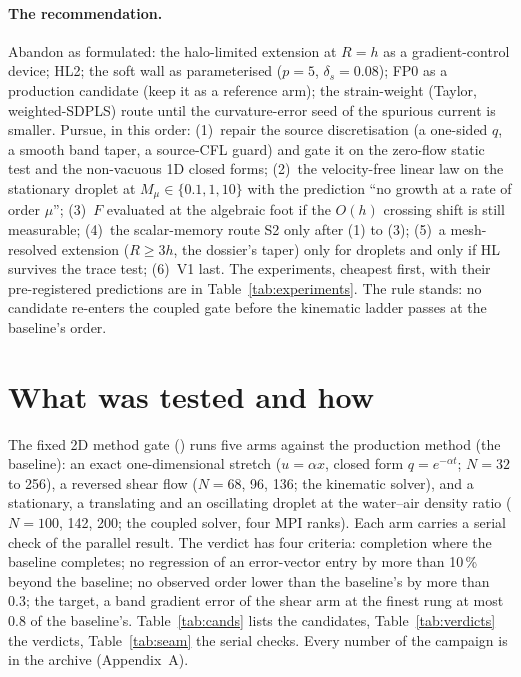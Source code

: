\documentclass[11pt,a4paper]{article}
\newcommand{\archive}{\path{shared-method-config-2026-09-01-192-g1150e68}}
\begin{document}
\paragraph{The recommendation.} Abandon as formulated: the halo-limited extension at $R=h$ as a
gradient-control device; HL2; the soft wall as parameterised ($p=5$, $\delta_s=0.08$); FP0 as
a production candidate (keep it as a reference arm); the strain-weight (Taylor, weighted-SDPLS)
route until the curvature-error seed of the spurious current is smaller. Pursue, in this
order: (1)~repair the source discretisation (a one-sided $q$, a smooth band taper, a source-CFL
guard) and gate it on the zero-flow static test and the non-vacuous 1D closed forms; (2)~the
velocity-free linear law on the stationary droplet at $M_\mu\in\{0.1,1,10\}$ with the
prediction ``no growth at a rate of order $\mu$''; (3)~$F$ evaluated at the algebraic foot if
the $O(h)$ crossing shift is still measurable; (4)~the scalar-memory route S2 only after (1) to
(3); (5)~a mesh-resolved extension ($R\ge3h$, the dossier's taper) only for droplets and only if
HL survives the trace test; (6)~V1 last. The experiments, cheapest first, with their
pre-registered predictions are in Table~\ref{tab:experiments}. The rule stands: no candidate
re-enters the coupled gate before the kinematic ladder passes at the baseline's order.

\section{What was tested and how}
\label{sec:gate}

The fixed 2D method gate () runs five arms against the
production method (the baseline): an exact one-dimensional stretch ($u=\alpha x$, closed form
$q=e^{-\alpha t}$; $N=32$ to 256), a reversed shear flow ($N=68$, 96, 136; the kinematic
solver), and a stationary, a translating and an oscillating droplet at the water--air density
ratio ($N=100$, 142, 200; the coupled solver, four MPI ranks). Each arm carries a serial check
of the parallel result. The verdict has four criteria: completion where the baseline completes;
no regression of an error-vector entry by more than 10\,\% beyond the baseline; no observed
order lower than the baseline's by more than 0.3; the target, a band gradient error of the
shear arm at the finest rung at most 0.8 of the baseline's. Table~\ref{tab:cands} lists the
candidates, Table~\ref{tab:verdicts} the verdicts, Table~\ref{tab:seam} the serial checks.
Every number of the campaign is in the archive \archive{} (Appendix~A).
\end{document}
